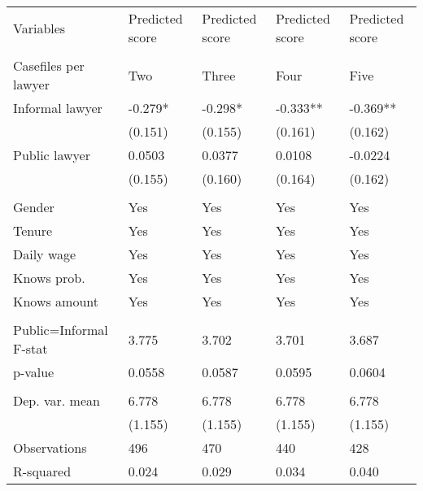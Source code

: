 
  \centering

    \begin{tabular}{lllll}
          &       &       &       &  \\
    \midrule
    \midrule
    Variables & Predicted score & Predicted score & Predicted score & Predicted score \\
          &       &       &       &  \\
    Casefiles per lawyer & Two   & Three & Four  & Five \\
    \midrule
    Informal lawyer & -0.279* & -0.298* & -0.333** & -0.369** \\
          & (0.151) & (0.155) & (0.161) & (0.162) \\
    Public lawyer & 0.0503 & 0.0377 & 0.0108 & -0.0224 \\
          & (0.155) & (0.160) & (0.164) & (0.162) \\
          &       &       &       &  \\
    Gender & Yes   & Yes   & Yes   & Yes \\
    Tenure & Yes   & Yes   & Yes   & Yes \\
    Daily wage & Yes   & Yes   & Yes   & Yes \\
    Knows prob. & Yes   & Yes   & Yes   & Yes \\
    Knows amount & Yes   & Yes   & Yes   & Yes \\
          &       &       &       &  \\
    Public=Informal F-stat & 3.775 & 3.702 & 3.701 & 3.687 \\
    p-value & 0.0558 & 0.0587 & 0.0595 & 0.0604 \\
          &       &       &       &  \\
    \midrule
    Dep. var. mean & 6.778 & 6.778 & 6.778 & 6.778 \\
          & (1.155) & (1.155) & (1.155) & (1.155) \\
    Observations & 496   & 470   & 440   & 428 \\
    R-squared & 0.024 & 0.029 & 0.034 & 0.040 \\
    \bottomrule
    \bottomrule
    \end{tabular}%


